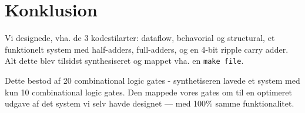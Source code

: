 \section{Konklusion}

Vi designede, vha. de 3 kodestilarter: dataflow, behavorial og structural, et funktionelt system med half-adders, full-adders, og en 4-bit ripple carry adder. Alt dette blev tilsidst synthesiseret og mappet vha. en \texttt{make file}.

Dette bestod af 20 combinational logic gates - synthetiseren lavede et system med kun 10 combinational logic gates. Den mappede vores gates om til en optimeret udgave af det system vi selv havde designet --- med 100\% samme funktionalitet.
